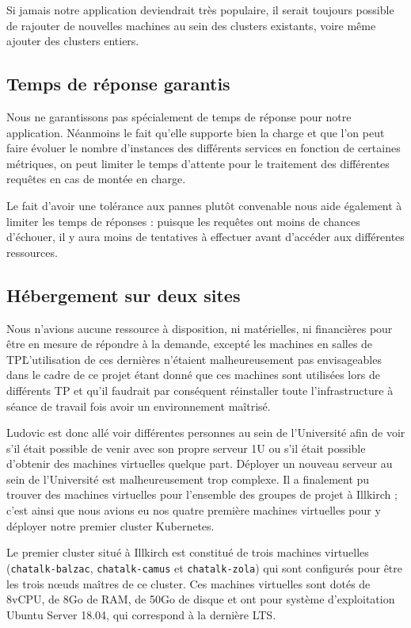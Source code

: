 Si jamais notre application deviendrait très populaire, il serait
toujours possible de rajouter de nouvelles machines au sein des clusters
existants, voire même ajouter des clusters entiers.

\subsection{Temps de réponse garantis}

Nous ne garantissons pas spécialement de temps de réponse pour notre
application. Néanmoins le fait qu'elle supporte bien la charge et que
l'on peut faire évoluer le nombre d'instances des différents services en
fonction de certaines métriques, on peut limiter le temps d'attente pour
le traitement des différentes requêtes en cas de montée en charge.

Le fait d'avoir une tolérance aux pannes plutôt convenable nous aide
également à limiter les temps de réponses : puisque les requêtes ont
moins de chances d'échouer, il y aura moins de tentatives à effectuer
avant d'accéder aux différentes ressources.

\subsection{Hébergement sur deux sites}

Nous n'avions aucune ressource à disposition, ni matérielles, ni
financières pour être en mesure de répondre à la demande, excepté les
machines en salles de TP\.
L'utilisation de ces dernières n'étaient malheureusement pas envisageables
dans le cadre de ce projet étant donné que ces machines sont utilisées lors
de différents TP et qu'il faudrait par conséquent réinstaller toute
l'infrastructure à séance de travail fois avoir un environnement maîtrisé.

Ludovic est donc allé voir différentes personnes au sein de l'Université
afin de voir s'il était possible de venir avec son propre serveur 1U ou
s'il était possible d'obtenir des machines virtuelles quelque part.
Déployer un nouveau serveur au sein de l'Université est malheureusement
trop complexe. Il a finalement pu trouver des machines virtuelles pour
l'ensemble des groupes de projet à Illkirch ; c'est ainsi que nous
avions eu nos quatre première machines virtuelles pour y déployer notre
premier cluster Kubernetes.

Le premier cluster situé à Illkirch est constitué de trois machines
virtuelles (\texttt{chatalk-balzac}, \texttt{chatalk-camus} et
\texttt{chatalk-zola}) qui sont configurés pour être les trois nœuds
maîtres de ce cluster. Ces machines virtuelles sont dotés de 8vCPU,
de 8Go de RAM, de 50Go de disque et ont pour système d'exploitation
Ubuntu Server 18.04, qui correspond à la dernière LTS.

